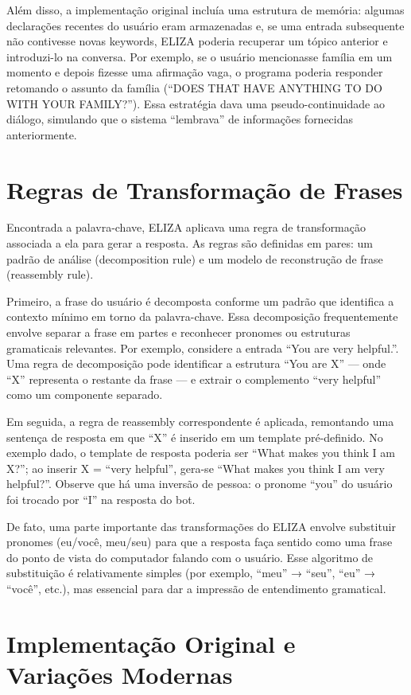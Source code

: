\documentclass[a4paper,oneside]{book}
\begin{document}
Além disso, a implementação original incluía uma estrutura de memória: algumas declarações recentes do usuário eram armazenadas e, se uma entrada subsequente não contivesse novas keywords, ELIZA poderia recuperar um tópico anterior e introduzi-lo na conversa. Por exemplo, se o usuário mencionasse família em um momento e depois fizesse uma afirmação vaga, o programa poderia responder retomando o assunto da família (“DOES THAT HAVE ANYTHING TO DO WITH YOUR FAMILY?”). Essa estratégia dava uma pseudo-continuidade ao diálogo, simulando que o sistema “lembrava” de informações fornecidas anteriormente.

\section{Regras de Transformação de Frases}

Encontrada a palavra-chave, ELIZA aplicava uma regra de transformação associada a ela para gerar a resposta. As regras são definidas em pares: um padrão de análise (decomposition rule) e um modelo de reconstrução de frase (reassembly rule).

Primeiro, a frase do usuário é decomposta conforme um padrão que identifica a contexto mínimo em torno da palavra-chave. Essa decomposição frequentemente envolve separar a frase em partes e reconhecer pronomes ou estruturas gramaticais relevantes. Por exemplo, considere a entrada “You are very helpful.”. Uma regra de decomposição pode identificar a estrutura “You are X” — onde “X” representa o restante da frase — e extrair o complemento “very helpful” como um componente separado.

Em seguida, a regra de reassembly correspondente é aplicada, remontando uma sentença de resposta em que “X” é inserido em um template pré-definido. No exemplo dado, o template de resposta poderia ser “What makes you think I am X?”; ao inserir X = “very helpful”, gera-se “What makes you think I am very helpful?”. Observe que há uma inversão de pessoa: o pronome “you” do usuário foi trocado por “I” na resposta do bot.

De fato, uma parte importante das transformações do ELIZA envolve substituir pronomes (eu/você, meu/seu) para que a resposta faça sentido como uma frase do ponto de vista do computador falando com o usuário. Esse algoritmo de substituição é relativamente simples (por exemplo, “meu” → “seu”, “eu” → “você”, etc.), mas essencial para dar a impressão de entendimento gramatical.

\section{Implementação Original e Variações Modernas}
\end{document}
